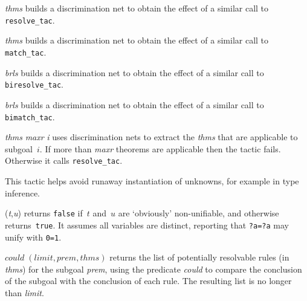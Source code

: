 \begin{ttdescription}
\item[\ttindexbold{net_resolve_tac} {\it thms}] 
builds a discrimination net to obtain the effect of a similar call to {\tt
resolve_tac}.

\item[\ttindexbold{net_match_tac} {\it thms}] 
builds a discrimination net to obtain the effect of a similar call to {\tt
match_tac}.

\item[\ttindexbold{net_biresolve_tac} {\it brls}] 
builds a discrimination net to obtain the effect of a similar call to {\tt
biresolve_tac}.

\item[\ttindexbold{net_bimatch_tac} {\it brls}] 
builds a discrimination net to obtain the effect of a similar call to {\tt
bimatch_tac}.

\item[\ttindexbold{filt_resolve_tac} {\it thms} {\it maxr} {\it i}] 
uses discrimination nets to extract the {\it thms} that are applicable to
subgoal~$i$.  If more than {\it maxr\/} theorems are applicable then the
tactic fails.  Otherwise it calls {\tt resolve_tac}.  

This tactic helps avoid runaway instantiation of unknowns, for example in
type inference.

\item[\ttindexbold{could_unify} ({\it t},{\it u})] 
returns {\tt false} if~$t$ and~$u$ are `obviously' non-unifiable, and
otherwise returns~{\tt true}.  It assumes all variables are distinct,
reporting that {\tt ?a=?a} may unify with {\tt 0=1}.

\item[\ttindexbold{filter_thms} $could\; (limit,prem,thms)$] 
returns the list of potentially resolvable rules (in {\it thms\/}) for the
subgoal {\it prem}, using the predicate {\it could\/} to compare the
conclusion of the subgoal with the conclusion of each rule.  The resulting list
is no longer than {\it limit}.
\end{ttdescription}




